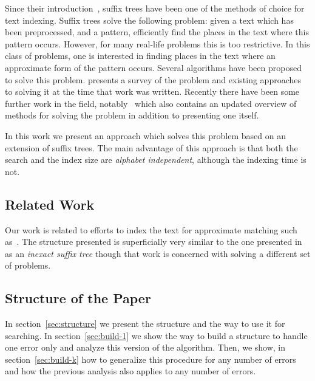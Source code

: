 Since their introduction~\cite{weiner}, suffix trees have been one of the methods of choice for text indexing. Suffix trees solve the following problem: given a text which has been preprocessed, and a pattern, efficiently find the places in the text where this pattern occurs.  However, for many real-life problems this is too restrictive. In this class of problems, one is interested in finding places in the text where an approximate form of the pattern occurs. Several algorithms have been proposed to solve this problem. \cite{navarro:guided} presents a survey of the problem and existing approaches to solving it at the time that work was written. Recently there have been some further work in the field, notably~\cite{maass:text} which also contains an updated overview of methods for solving the problem in addition to presenting one itself.

In this work we present an approach which solves this problem based on an extension of suffix trees. The main advantage of this approach is that both the search and the index size are \emph{alphabet independent}, although the indexing time is not.

\subsection{Related Work}

Our work is related to efforts to index the text for approximate matching such as~\cite{maass:text,mosche}. The structure presented is superficially very similar to the one presented in~\cite{inexact} as an \textit{inexact suffix tree} though that work is concerned with solving a different set of problems.

\subsection{Structure of the Paper}

In section~\ref{sec:structure} we present the structure and the way to use it for searching. In section~\ref{sec:build-1} we show the way to build a structure to handle one error only and analyze this version of the algorithm. Then, we show, in section~\ref{sec:build-k} how to generalize this procedure for any number of errors and how the previous analysis also applies to any number of errors.


